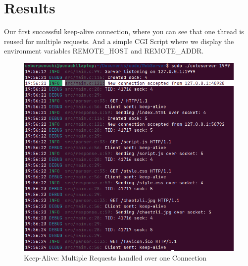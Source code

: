 \section*{Results}

Our first successful keep-alive connection, where you can see that one thread is reused for multiple requests. %
And a simple CGI Script where we display the environment variables REMOTE\_HOST and REMOTE\_ADDR. 

\begin{figure}[h]
    \centering
    \begin{minipage}{0.55\textwidth}
        \centering
        \includegraphics[width=\textwidth]{figures/keep-alive.png}
        \caption{Keep-Alive: Multiple Requests handled over one Connection}
    \end{minipage}
    \hfill
    \begin{minipage}{0.35\textwidth}
        \centering

\end{minipage}
\end{figure}
